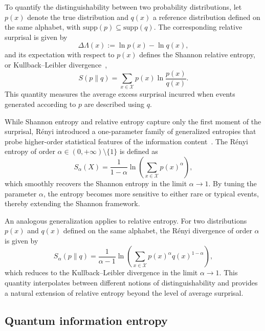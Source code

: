 \documentclass[a4paper, amsfonts, amssymb, amsmath, reprint, showkeys, nofootinbib, twoside, aps, pra]{revtex4-2}
\theoremstyle{definition}
\begin{document}
To quantify the distinguishability between two probability distributions, let $p(x)$ denote the true distribution and $q(x)$ a reference distribution defined on the same alphabet, with $\mathrm{supp}(p)\subseteq\mathrm{supp}(q)$. 
The corresponding relative surprisal is given by
\begin{equation}\label{relative surprisal}
\Delta\Lambda(x) := \ln p(x)-\ln q(x),
\end{equation}
and its expectation with respect to $p(x)$ defines the Shannon relative entropy, or Kullback--Leibler divergence~\cite{Kullback1951},
\begin{equation}
S(p\| q)
= \sum_{x\in\mathcal{X}} p(x)\ln\frac{p(x)}{q(x)}.
\end{equation}
This quantity measures the average excess surprisal incurred when events generated according to $p$ are described using $q$.

While Shannon entropy and relative entropy capture only the first moment of the surprisal, Rényi introduced a one-parameter family of generalized entropies that probe higher-order statistical features of the information content~\cite{Renyi1961}. 
The Rényi entropy of order $\alpha \in (0,+\infty)\setminus\{1\}$ is defined as
\begin{equation}\label{Renyi}
S_\alpha(X)
= \frac{1}{1-\alpha}
  \ln\!\left(
  \sum_{x\in\mathcal{X}} p(x)^{\alpha}
  \right),
\end{equation}
which smoothly recovers the Shannon entropy in the limit $\alpha\to1$.
By tuning the parameter $\alpha$, the entropy becomes more sensitive to either rare or typical events, thereby extending the Shannon framework.

An analogous generalization applies to relative entropy. 
For two distributions $p(x)$ and $q(x)$ defined on the same alphabet, the Rényi divergence of order $\alpha$ is given by
\begin{equation}
S_\alpha(p\| q)
= \frac{1}{\alpha-1}
  \ln\!\left(
  \sum_{x\in\mathcal{X}} p(x)^{\alpha} q(x)^{1-\alpha}
  \right),
\end{equation}
which reduces to the Kullback--Leibler divergence in the limit $\alpha\to1$. 
This quantity interpolates between different notions of distinguishability and provides a natural extension of relative entropy beyond the level of average surprisal.



\subsection{Quantum information entropy}
\end{document}
